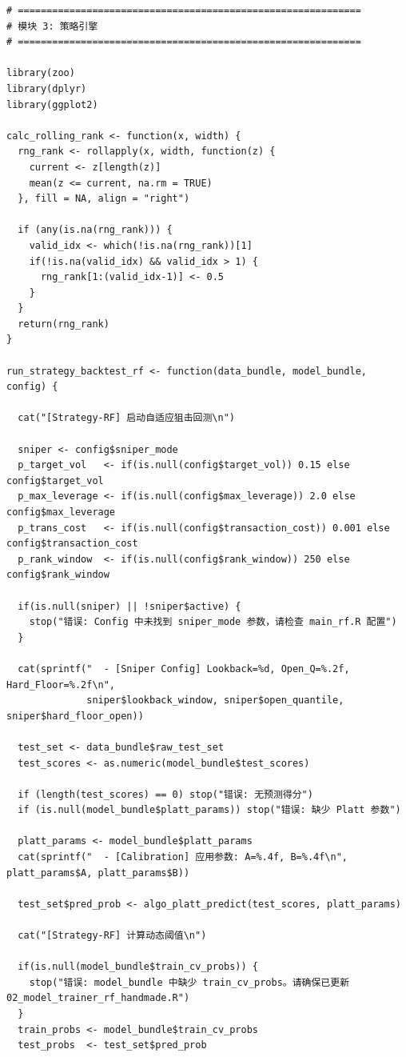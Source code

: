 \documentclass[11pt, a4paper]{article}
\begin{document}
\begin{verbatim}
# ============================================================
# 模块 3: 策略引擎
# ============================================================

library(zoo)
library(dplyr)
library(ggplot2)

calc_rolling_rank <- function(x, width) {
  rng_rank <- rollapply(x, width, function(z) {
    current <- z[length(z)]
    mean(z <= current, na.rm = TRUE)
  }, fill = NA, align = "right")
  
  if (any(is.na(rng_rank))) {
    valid_idx <- which(!is.na(rng_rank))[1]
    if(!is.na(valid_idx) && valid_idx > 1) {
      rng_rank[1:(valid_idx-1)] <- 0.5 
    }
  }
  return(rng_rank)
}

run_strategy_backtest_rf <- function(data_bundle, model_bundle, config) {
  
  cat("[Strategy-RF] 启动自适应狙击回测\n")

  sniper <- config$sniper_mode
  p_target_vol   <- if(is.null(config$target_vol)) 0.15 else config$target_vol
  p_max_leverage <- if(is.null(config$max_leverage)) 2.0 else config$max_leverage
  p_trans_cost   <- if(is.null(config$transaction_cost)) 0.001 else config$transaction_cost
  p_rank_window  <- if(is.null(config$rank_window)) 250 else config$rank_window
  
  if(is.null(sniper) || !sniper$active) {
    stop("错误: Config 中未找到 sniper_mode 参数，请检查 main_rf.R 配置")
  }
  
  cat(sprintf("  - [Sniper Config] Lookback=%d, Open_Q=%.2f, Hard_Floor=%.2f\n", 
              sniper$lookback_window, sniper$open_quantile, sniper$hard_floor_open))
  
  test_set <- data_bundle$raw_test_set
  test_scores <- as.numeric(model_bundle$test_scores)
  
  if (length(test_scores) == 0) stop("错误: 无预测得分")
  if (is.null(model_bundle$platt_params)) stop("错误: 缺少 Platt 参数")
  
  platt_params <- model_bundle$platt_params
  cat(sprintf("  - [Calibration] 应用参数: A=%.4f, B=%.4f\n", platt_params$A, platt_params$B))
  
  test_set$pred_prob <- algo_platt_predict(test_scores, platt_params)
  
  cat("[Strategy-RF] 计算动态阈值\n")
  
  if(is.null(model_bundle$train_cv_probs)) {
    stop("错误: model_bundle 中缺少 train_cv_probs。请确保已更新 02_model_trainer_rf_handmade.R")
  }
  train_probs <- model_bundle$train_cv_probs
  test_probs  <- test_set$pred_prob


\end{verbatim}
\end{document}
